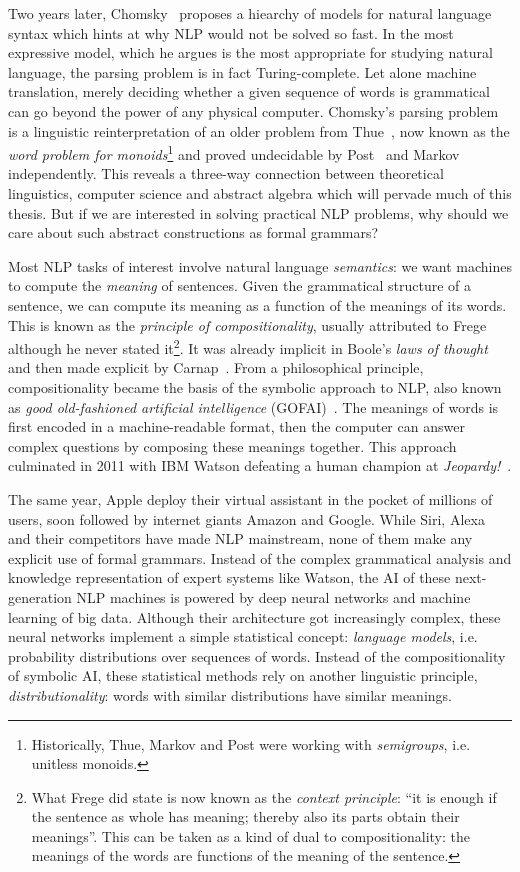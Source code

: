 Two years later, Chomsky~\cite{Chomsky56, Chomsky57} proposes a hiearchy of models for natural language syntax which hints at why NLP would not be solved so fast.
In the most expressive model, which he argues is the most appropriate for studying natural language, the parsing problem is in fact Turing-complete.
Let alone machine translation, merely deciding whether a given sequence of words is grammatical can go beyond the power of any physical computer.
Chomsky's parsing problem is a linguistic reinterpretation of an older problem from Thue~\cite{Thue14}, now known as the \emph{word problem for monoids}\footnote{
Historically, Thue, Markov and Post were working with \emph{semigroups}, i.e. unitless monoids.
} and proved undecidable by Post~\cite{Post47} and Markov~\cite{Markov47} independently.
This reveals a three-way connection between theoretical linguistics, computer science and abstract algebra which will pervade much of this thesis.
But if we are interested in solving practical NLP problems, why should we care about such abstract constructions as formal grammars?

Most NLP tasks of interest involve natural language \emph{semantics}: we want machines to compute the \emph{meaning} of sentences.
Given the grammatical structure of a sentence, we can compute its meaning as a function of the meanings of its words.
This is known as the \emph{principle of compositionality}, usually attributed to Frege~\cite{Frege84} although he never stated it\footnote{
What Frege did state is now known as the \emph{context principle}:
``it is enough if the sentence as whole has meaning; thereby also its parts obtain their meanings''.
This can be taken as a kind of dual to compositionality: the meanings of the words are functions of the meaning of the sentence.
}.
It was already implicit in Boole's \emph{laws of thought}~\cite{Boole54} and then made explicit by Carnap~\cite{Carnap47}.
From a philosophical principle, compositionality became the basis of the symbolic approach to NLP, also known as \emph{good old-fashioned artificial intelligence} (GOFAI)~\cite{Haugeland89}.
The meanings of words is first encoded in a machine-readable format, then the computer can answer complex questions by composing these meanings together.
This approach culminated in 2011 with IBM Watson defeating a human champion at \emph{Jeopardy!}~\cite{LallyFodor11}.

The same year, Apple deploy their virtual assistant in the pocket of millions of users, soon followed by internet giants Amazon and Google.
While Siri, Alexa and their competitors have made NLP mainstream, none of them make any explicit use of formal grammars.
Instead of the complex grammatical analysis and knowledge representation of expert systems like Watson, the AI of these next-generation NLP machines is powered by deep neural networks and machine learning of big data.
Although their architecture got increasingly complex, these neural networks implement a simple statistical concept: \emph{language models}, i.e. probability distributions over sequences of words.
Instead of the compositionality of symbolic AI, these statistical methods rely on another linguistic principle, \emph{distributionality}: words with similar distributions have similar meanings.

